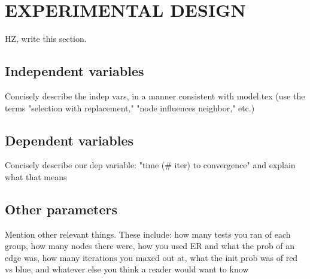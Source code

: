 
\section*{EXPERIMENTAL DESIGN}

HZ, write this section.

\subsection{Independent variables}

Concisely describe the indep vars, in a manner consistent with model.tex (use
the terms "selection with replacement," "node influences neighbor," etc.)


\subsection{Dependent variables}

Concisely describe our dep variable: "time (# iter) to convergence" and
explain what that means

\subsection{Other parameters}

Mention other relevant things. These include: how many tests you ran of each
group, how many nodes there were, how you used ER and what the prob of an edge
was, how many iterations you maxed out at, what the init prob was of red vs
blue, and whatever else you think a reader would want to know

